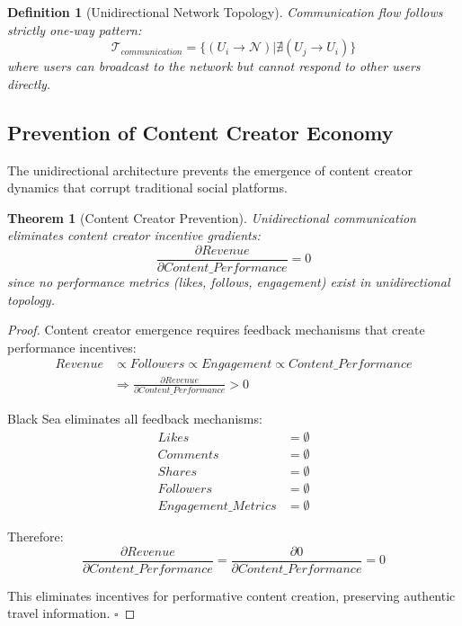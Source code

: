 \documentclass[12pt,a4paper]{article}
\newtheorem{theorem}{Theorem}
\newtheorem{definition}{Definition}
\begin{document}
\begin{definition}[Unidirectional Network Topology]
Communication flow follows strictly one-way pattern:
\begin{equation}
\mathcal{T}_{communication} = \{(U_i \rightarrow \mathcal{N}) | \nexists (U_j \rightarrow U_i)\}
\end{equation}
where users can broadcast to the network but cannot respond to other users directly.
\end{definition}

\subsection{Prevention of Content Creator Economy}

The unidirectional architecture prevents the emergence of content creator dynamics that corrupt traditional social platforms.

\begin{theorem}[Content Creator Prevention]
Unidirectional communication eliminates content creator incentive gradients:
\begin{equation}
\frac{\partial Revenue}{\partial Content\_Performance} = 0
\end{equation}
since no performance metrics (likes, follows, engagement) exist in unidirectional topology.
\end{theorem}

\begin{proof}
Content creator emergence requires feedback mechanisms that create performance incentives:
\begin{align}
Revenue &\propto Followers \propto Engagement \propto Content\_Performance \\
&\Rightarrow \frac{\partial Revenue}{\partial Content\_Performance} > 0
\end{align}

Black Sea eliminates all feedback mechanisms:
\begin{align}
Likes &= \emptyset \\
Comments &= \emptyset \\
Shares &= \emptyset \\
Followers &= \emptyset \\
Engagement\_Metrics &= \emptyset
\end{align}

Therefore:
\begin{equation}
\frac{\partial Revenue}{\partial Content\_Performance} = \frac{\partial 0}{\partial Content\_Performance} = 0
\end{equation}

This eliminates incentives for performative content creation, preserving authentic travel information. $\square$
\end{proof}
\end{document}
